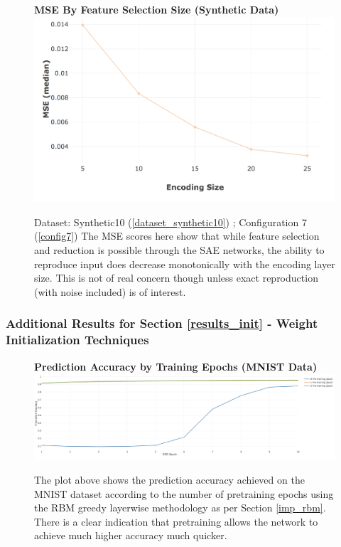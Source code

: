 \documentclass[a4paper,11pt,oneside]{article}
\theoremstyle{plain}
\theoremstyle{definition}
\begin{document}
	\begin{figure}[H]
		\centering 
		\textbf{MSE By Feature Selection Size (Synthetic Data)}
		\includegraphics[scale=0.3]{images/results/8_appendix/synth_sae_mse.png} 
		\caption[MSE By Feature Selection Size (Synthetic Data)]{Dataset: Synthetic10 (\ref{dataset_synthetic10}) ; Configuration 7 (\ref{config7})
			\newline The MSE scores here show that while feature selection and reduction is possible through the SAE networks, the ability to reproduce input does decrease monotonically with the encoding layer size. This is not of real concern though unless exact reproduction (with noise included) is of interest.}
		\label{figure-synth_sae_mse}
	\end{figure}
	
	\subsubsection{Additional Results for Section \ref{results_init} - Weight Initialization Techniques }\label{results_init_appendix}
	
	\begin{figure}[H]
		\centering 
		\textbf{Prediction Accuracy by Training Epochs (MNIST Data)} 
		\includegraphics[scale=0.3]{images/results/8_appendix/rbm_pretraining.png}
		\caption[Prediction Accuracy by Training Epochs (MNIST Data)]{The plot above shows the prediction accuracy achieved on the MNIST dataset according to the number of pretraining epochs using the RBM greedy layerwise methodology as per Section \ref{imp_rbm}. There is a clear indication that pretraining allows the network to achieve much higher accuracy much quicker.}
		\label{figure-rbm_pretraining}
	\end{figure}
	
\end{document}
